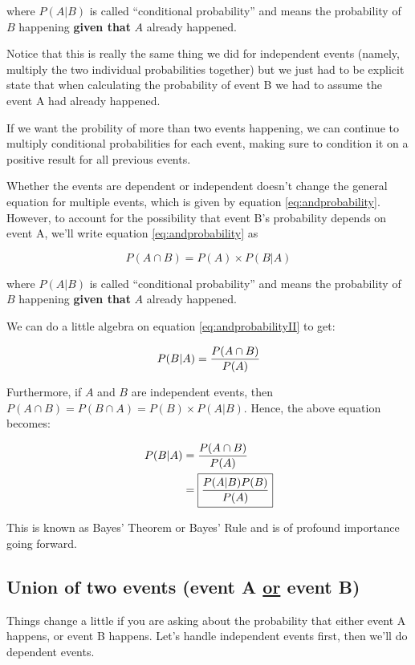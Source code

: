 where $P(A|B)$ is called ``conditional probability'' and means the
probability of $B$ happening \textbf{given that} $A$ already happened.

Notice that this is really the same thing we did for independent
events (namely, multiply the two individual probabilities together)
but we just had to be explicit state that when calculating the
probability of event B we had to assume the event A had already happened.

If we want the probility of more than two events happening, we can
continue to multiply conditional probabilities for each event, making
sure to condition it on a positive result for all previous events.

Whether the events are dependent or independent doesn't change the
general equation for multiple events, which is given by equation
\eqref{eq:andprobability}.  However, to account for the possibility
that event B's probability depends on event A, we'll write equation
\eqref{eq:andprobability} as

\begin{equation}\label{eq:andprobabilityII}
  P(A \cap B) = P(A) \times P(B|A)
\end{equation}

where $P(A|B)$ is called ``conditional probability'' and means the
probability of $B$ happening \textbf{given that} $A$ already happened.

We can do a little algebra on equation \eqref{eq:andprobabilityII} to
get:

\begin{equation}
  P(B|A) = {P(A \cap B)\over P(A)}
\end{equation}

Furthermore, if $A$ and $B$ are independent events, then $P(A\cap B) =
P(B \cap A) = P(B) \times P(A|B)$.  Hence, the above equation becomes:

\begin{align}
  P(B|A) &= {P(A \cap B)\over P(A)}\\
         &= \boxed{{P(A|B) P(B) \over P(A)}}
\end{align}



This is known as Bayes' Theorem or Bayes' Rule and is of profound
importance going forward.



\subsection*{Union of two events (event A \underline{or} event B)}
Things change a little if you are asking about the probability that
either event A happens, or event B happens.  Let's handle independent
events first, then we'll do dependent events.

